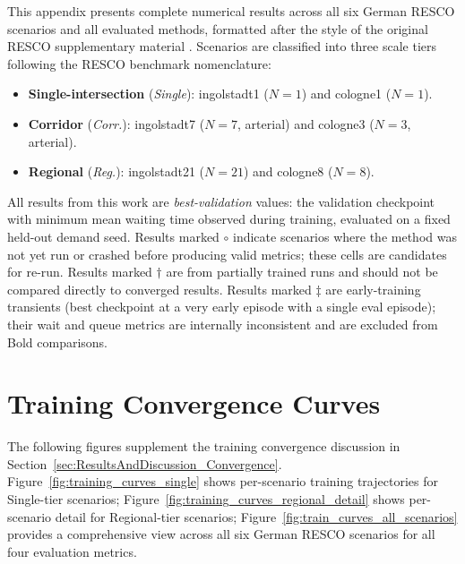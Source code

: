 This appendix presents complete numerical results across all six German RESCO scenarios and all evaluated methods, formatted after the style of the original RESCO supplementary material \citep{ault2021reinforcement}. Scenarios are classified into three scale tiers following the RESCO benchmark nomenclature:
\begin{itemize}
  \item \textbf{Single-intersection} (\textit{Single}): ingolstadt1 ($N=1$) and cologne1 ($N=1$).
  \item \textbf{Corridor} (\textit{Corr.}): ingolstadt7 ($N=7$, arterial) and cologne3 ($N=3$, arterial).
  \item \textbf{Regional} (\textit{Reg.}): ingolstadt21 ($N=21$) and cologne8 ($N=8$).
\end{itemize}

All results from this work are \textit{best-validation} values: the validation checkpoint with minimum mean waiting time observed during training, evaluated on a fixed held-out demand seed. Results marked $\circ$ indicate scenarios where the method was not yet run or crashed before producing valid metrics; these cells are candidates for re-run. Results marked $\dagger$ are from partially trained runs and should not be compared directly to converged results. Results marked $\ddagger$ are early-training transients (best checkpoint at a very early episode with a single eval episode); their wait and queue metrics are internally inconsistent and are excluded from Bold comparisons.



\section{Training Convergence Curves}
\label{sec:Appendix_TrainingCurves}

The following figures supplement the training convergence discussion in Section~\ref{sec:ResultsAndDiscussion_Convergence}. Figure~\ref{fig:training_curves_single} shows per-scenario training trajectories for Single-tier scenarios; Figure~\ref{fig:training_curves_regional_detail} shows per-scenario detail for Regional-tier scenarios; Figure~\ref{fig:train_curves_all_scenarios} provides a comprehensive view across all six German RESCO scenarios for all four evaluation metrics.

